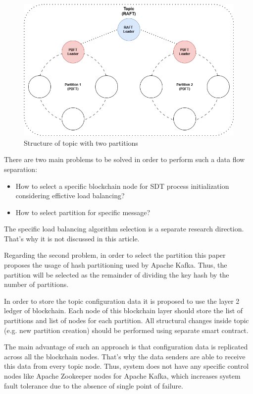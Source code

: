 \documentclass[10pt]{llncs}
\begin{document}
\begin{figure}
    \includegraphics[width=\textwidth]{two-layered-blockchain.png}
    \caption{Structure of topic with two partitions} \label{blockchain_layers}
\end{figure}

There are two main problems to be solved in order to perform such a data flow separation:

\begin{itemize}
    \item How to select a specific blockchain node for SDT process initialization considering effictive load balancing?
    \item How to select partition for specific message?
\end{itemize}

The specific load balancing algorithm selection is a separate research direction.
That's why it is not discussed in this article.

Regarding the second problem, in order to select the partition this paper proposes the usage of hash partitioning used by Apache Kafka.
Thus, the partition will be selected as the remainder of dividing the key hash by the number of partitions.

In order to store the topic configuration data it is proposed to use the layer 2 ledger of blockchain.
Each node of this blockchain layer should store the list of partitions and list of nodes for each partition.
All structural changes inside topic (e.g. new partition creation) should be performed using separate smart contract. 

The main advantage of such an approach is that configuration data is replicated across all the blockchain nodes.
That's why the data senders are able to receive this data from every topic node.
Thus, system does not have any specific control nodes like Apache Zookeeper nodes for Apache Kafka, which increases system fault tolerance 
due to the absence of single point of failure.
\end{document}

